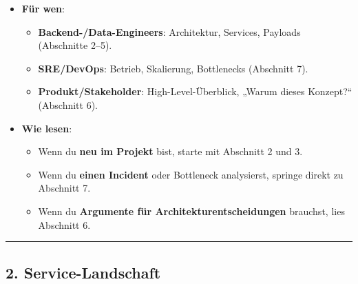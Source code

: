 \begin{itemize}
\tightlist
\item
  \textbf{Für wen}:

  \begin{itemize}
  \tightlist
  \item
    \textbf{Backend-/Data-Engineers}: Architektur, Services, Payloads
    (Abschnitte 2--5).
  \item
    \textbf{SRE/DevOps}: Betrieb, Skalierung, Bottlenecks (Abschnitt 7).
  \item
    \textbf{Produkt/Stakeholder}: High-Level-Überblick, „Warum dieses
    Konzept?{\kern0pt}`` (Abschnitt 6).
  \end{itemize}
\item
  \textbf{Wie lesen}:

  \begin{itemize}
  \tightlist
  \item
    Wenn du \textbf{neu im Projekt} bist, starte mit Abschnitt 2 und 3.
  \item
    Wenn du \textbf{einen Incident} oder Bottleneck analysierst, springe
    direkt zu Abschnitt 7.
  \item
    Wenn du \textbf{Argumente für Architekturentscheidungen} brauchst,
    lies Abschnitt 6.
  \end{itemize}
\end{itemize}

\begin{center}\rule{0.5\linewidth}{0.5pt}\end{center}

\subsection{2. Service-Landschaft}\label{service-landschaft}


